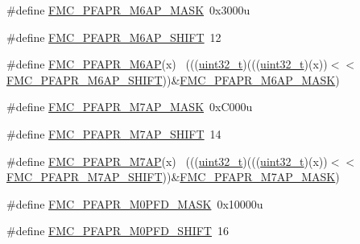 \begin{DoxyCompactItemize}
\item 
\#define \hyperlink{group___f_m_c___register___masks_gaa369bff90649d5651eec5c6a306b3502}{F\+M\+C\+\_\+\+P\+F\+A\+P\+R\+\_\+\+M6\+A\+P\+\_\+\+M\+A\+SK}~0x3000u
\item 
\#define \hyperlink{group___f_m_c___register___masks_ga20c7a1c28737c267b2210e13f7483628}{F\+M\+C\+\_\+\+P\+F\+A\+P\+R\+\_\+\+M6\+A\+P\+\_\+\+S\+H\+I\+FT}~12
\item 
\#define \hyperlink{group___f_m_c___register___masks_ga406209e8b290dac802df4f5eafd631fc}{F\+M\+C\+\_\+\+P\+F\+A\+P\+R\+\_\+\+M6\+AP}(x)                                            ~(((\hyperlink{_p_e___types_8h_a33594304e786b158f3fb30289278f5af}{uint32\+\_\+t})(((\hyperlink{_p_e___types_8h_a33594304e786b158f3fb30289278f5af}{uint32\+\_\+t})(x))$<$$<$\hyperlink{group___f_m_c___register___masks_ga20c7a1c28737c267b2210e13f7483628}{F\+M\+C\+\_\+\+P\+F\+A\+P\+R\+\_\+\+M6\+A\+P\+\_\+\+S\+H\+I\+FT}))\&\hyperlink{group___f_m_c___register___masks_gaa369bff90649d5651eec5c6a306b3502}{F\+M\+C\+\_\+\+P\+F\+A\+P\+R\+\_\+\+M6\+A\+P\+\_\+\+M\+A\+SK})
\item 
\#define \hyperlink{group___f_m_c___register___masks_ga87c7451b98f752717c6122892b4fc9a9}{F\+M\+C\+\_\+\+P\+F\+A\+P\+R\+\_\+\+M7\+A\+P\+\_\+\+M\+A\+SK}~0x\+C000u
\item 
\#define \hyperlink{group___f_m_c___register___masks_ga8117d628a5889cb4983db0cc892e669c}{F\+M\+C\+\_\+\+P\+F\+A\+P\+R\+\_\+\+M7\+A\+P\+\_\+\+S\+H\+I\+FT}~14
\item 
\#define \hyperlink{group___f_m_c___register___masks_ga3033882e65d59a8fe9a900148b76bc59}{F\+M\+C\+\_\+\+P\+F\+A\+P\+R\+\_\+\+M7\+AP}(x)                                            ~(((\hyperlink{_p_e___types_8h_a33594304e786b158f3fb30289278f5af}{uint32\+\_\+t})(((\hyperlink{_p_e___types_8h_a33594304e786b158f3fb30289278f5af}{uint32\+\_\+t})(x))$<$$<$\hyperlink{group___f_m_c___register___masks_ga8117d628a5889cb4983db0cc892e669c}{F\+M\+C\+\_\+\+P\+F\+A\+P\+R\+\_\+\+M7\+A\+P\+\_\+\+S\+H\+I\+FT}))\&\hyperlink{group___f_m_c___register___masks_ga87c7451b98f752717c6122892b4fc9a9}{F\+M\+C\+\_\+\+P\+F\+A\+P\+R\+\_\+\+M7\+A\+P\+\_\+\+M\+A\+SK})
\item 
\#define \hyperlink{group___f_m_c___register___masks_ga5f6efa8c02f2a2f04d5b62f8de35e9a9}{F\+M\+C\+\_\+\+P\+F\+A\+P\+R\+\_\+\+M0\+P\+F\+D\+\_\+\+M\+A\+SK}~0x10000u
\item 
\#define \hyperlink{group___f_m_c___register___masks_ga5d7609bb54910d8b7be4dc3b868c040c}{F\+M\+C\+\_\+\+P\+F\+A\+P\+R\+\_\+\+M0\+P\+F\+D\+\_\+\+S\+H\+I\+FT}~16

\end{DoxyCompactItemize}
